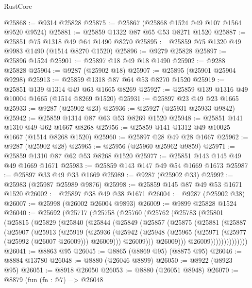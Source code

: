 \begin{lexlean}{RustCore}
\begin{coremodule}
@25868 := @9314 @25828
@25875 := @25867 (@25868 @1524 @49 @107 @1564 @9520 @9524)
@25881 := @25859 @1322 @87 @65 @53 @8271 @1520
@25887 := @25851 @75 @1318 @49 @64 @1490 @8270
@25895 := @25859 @75 @1320 @49 @9983 @1490 (@1514 @8270 @1520)
@25896 := @9279 @25828
@25897 := @25896 @1524
@25901 := @25897 @18 @49 @18 @1490
@25902 := @9288 @25828
@25904 := @9287 (@25902 @18)
@25907 := @25895 (@25901 @25904 @9298)
@25913 := @25859 @1318 @87 @64 @53 @8270 @1520
@25919 := @25851 @139 @1314 @49 @63 @1665 @8269
@25927 := @25859 @139 @1316 @49 @10004 @1665 (@1514 @8269 @1520)
@25931 := @25897 @23 @49 @23 @1665
@25933 := @9287 (@25902 @23)
@25936 := @25927 (@25931 @25933 @9842)
@25942 := @25859 @1314 @87 @63 @53 @8269 @1520
@25948 := @25851 @141 @1310 @49 @62 @1667 @8268
@25956 := @25859 @141 @1312 @49 @10025 @1667 (@1514 @8268 @1520)
@25960 := @25897 @28 @49 @28 @1667
@25962 := @9287 (@25902 @28)
@25965 := @25956 (@25960 @25962 @9859)
@25971 := @25859 @1310 @87 @62 @53 @8268 @1520
@25977 := @25851 @143 @145 @49 @49 @1669 @1671
@25983 := @25859 @143 @147 @49 @54 @1669 @1673
@25987 := @25897 @33 @49 @33 @1669
@25989 := @9287 (@25902 @33)
@25992 := @25983 (@25987 @25989 @9876)
@25998 := @25859 @145 @87 @49 @53 @1671 @1520
@26002 := @25897 @38 @49 @38 @1671
@26004 := @9287 (@25902 @38)
@26007 := @25998 (@26002 @26004 @9893)
@26009 := @9899 @25828 @1524
@26040 := @25692
    (@25717
      (@25758
        (@25760
          (@25762
            (@25783
              (@25801
                (@25815
                  (@25829
                    (@25840
                      (@25844
                        (@25849
                          (@25857
                            (@25875
                              (@25881
                                (@25887
                                  (@25907
                                    (@25913
                                      (@25919
                                        (@25936
                                          (@25942
                                            (@25948
                                              (@25965
                                                (@25971 (@25977 (@25992 (@26007 @26009))) @26009)))
                                            @26009)))
                                      @26009)))
                                @26009))))))))))))))
@26041 := @8863 @95
@26045 := @8865 (@8869 @95) (@8875 @95)
@26046 := @8884 @13780
@26048 := @8880 (@26046 @8899)
@26050 := @8922 (@8923 @95)
@26051 := @8918 @26050
@26053 := @8880 (@26051 @8948)
@26070 := @8879
    (fun (fn : @7) =>
    @26048

\end{coremodule}
\end{lexlean}
